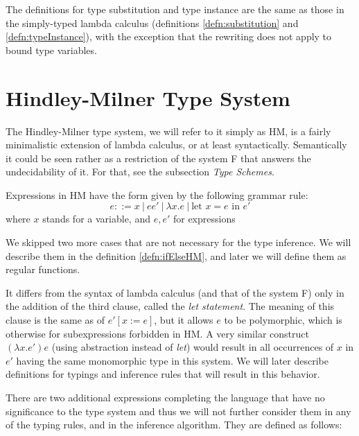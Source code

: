 The definitions for type substitution and type instance are the same as those in the simply-typed lambda calculus (definitions \ref{defn:substitution} and \ref{defn:typeInstance}), with the exception that the rewriting does not apply to bound type variables.

\section{Hindley-Milner Type System}

The Hindley-Milner type system, we will refer to it simply as HM, is a fairly minimalistic extension of lambda calculus, or at least syntactically. Semantically it could be seen rather as a restriction of the system F that answers the undecidability of it. For that, see the subsection \emph{Type Schemes}.

\begin{defn}[Expression in HM]
    \label{defn:syntaxHM}
    Expressions in HM have the form given by the following grammar rule:
    $$e ::= x\ |\ e e'\ |\ \lambda x . e\ |\ \text{let } x = e \text{ in } e'$$
    where $x$ stands for a variable, and $e, e'$ for expressions
\end{defn}

We skipped two more cases that are not necessary for the type inference. We will describe them in the definition \ref{defn:ifElseHM}, and later we will define them as regular functions.

It differs from the syntax of lambda calculus (and that of the system F) only in the addition of the third clause, called the \emph{let statement}. The meaning of this clause is the same as of $e' [x := e]$, but it allows $e$ to be polymorphic, which is otherwise for subexpressions forbidden in HM. A very similar construct $(\lambda x . e') e$ (using abstraction instead of \emph{let}) would result in all occurrences of $x$ in $e'$ having the same monomorphic type in this system. We will later describe definitions for typings and inference rules that will result in this behavior.

There are two additional expressions completing the language that have no significance to the type system and thus we will not further consider them in any of the typing rules, and in the inference algorithm. They are defined as follows:

